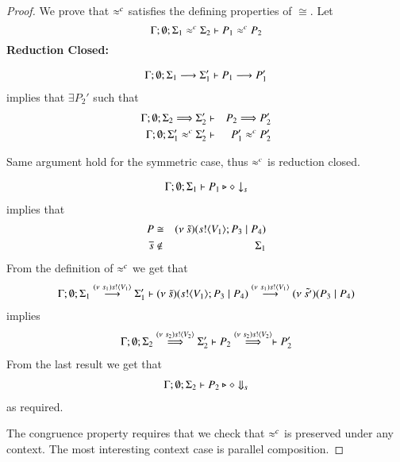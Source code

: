 \begin{proof}
	\noi We prove that $\approx^{c}$ satisfies the defining properties of $\cong$. Let 
%
	\[
		\Gamma; \emptyset; \Sigma_1 \approx^{c} \Sigma_2 \vdash P_1 \approx^{c} P_2
	\]
%
	{\bf Reduction Closed:}

	\begin{eqnarray*}
		\Gamma; \emptyset; \Sigma_1 \stackrel{}{\longrightarrow} \Sigma_1' \vdash P_1 \stackrel{}{\longrightarrow} P_1'
	\end{eqnarray*}
%
	\noi implies that 
	$\exists P_2'$ such that 
%
	\begin{eqnarray*}
		\Gamma; \emptyset; \Sigma_2 \stackrel{}{\Longrightarrow} \Sigma_2' &\vdash& P_2 \stackrel{}{\Longrightarrow} P_2'\\
		\Gamma; \emptyset; \Sigma_1' \approx^{c} \Sigma_2' &\vdash& P_1' \approx^{c} P_2'
	\end{eqnarray*}

	\noi Same argument hold for the symmetric case, thus $\approx^{c}$ is reduction closed.

%
	\begin{eqnarray*}
		\Gamma; \emptyset; \Sigma_1 \vdash P_1 \triangleright \diamond \downarrow_{s}
	\end{eqnarray*}
%
	implies that
	\begin{eqnarray*}
		P &\cong& (\nu\ \tilde{s})(s ! \langle V_1 \rangle ; P_3 \;|\; P_4)\\
		\overline{s} &\notin& \Sigma_1
	\end{eqnarray*}
%
	\noi From the definition of $\approx^{c}$ we get that
%
	\begin{eqnarray*}
		\Gamma; \emptyset; \Sigma_1 \stackrel{(\nu\ s_1) s ! \langle V_1 \rangle}{\longrightarrow} \Sigma_1' \vdash (\nu\ \tilde{s})(s ! \langle V_1 \rangle ; P_3 \;|\; P_4) \stackrel{(\nu\ s_1) s ! \langle V_1 \rangle}{\longrightarrow} (\nu\ \tilde{s'})(P_3 \;|\; P_4)
	\end{eqnarray*}
%
	\noi implies
%
	\begin{eqnarray*}
		\Gamma; \emptyset; \Sigma_2 \stackrel{(\nu\ s_2) s ! \langle V_2 \rangle}{\Longrightarrow} \Sigma_2' \vdash P_2 \stackrel{(\nu\ s_2) s ! \langle V_2 \rangle}{\Longrightarrow} \vdash P_2'
	\end{eqnarray*}
%
	\noi From the last result we get that
%
	\begin{eqnarray*}
		\Gamma; \emptyset; \Sigma_2 \vdash P_2 \triangleright \diamond \Downarrow_{s}
	\end{eqnarray*}
%
	\noi as required.


	\noi The congruence property requires that we check that $\approx^{c}$ is preserved under any context.
	The most interesting context case is parallel composition.


\end{proof}
